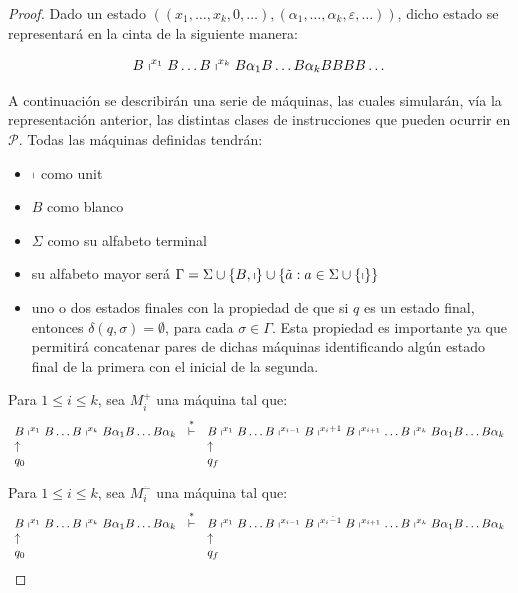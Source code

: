   \begin{proof}
    \PN Dado un estado $((x_{1}, \dotsc, x_{k}, 0, \dotsc),(\alpha_{1}, \dotsc, \alpha_{k}, \varepsilon, \dotsc))$,
    dicho estado se representará en la cinta de la siguiente manera:

    \[
      B \shortmid^{x_{1}} B \dotsc B \shortmid^{x_{k}} B \alpha_{1} B \dotsc B \alpha_{k} BBBB \dotsc
    \]

    \PN A continuación se describirán una serie de máquinas, las cuales simularán, vía la representación anterior, las
    distintas clases de instrucciones que pueden ocurrir en $\mathcal{P}$. Todas las máquinas definidas tendrán:

    \begin{itemize}
      \item $\shortmid$ como unit
      \item $B$ como blanco
      \item $\Sigma$ como su alfabeto terminal
      \item su alfabeto mayor será $\Gamma = \Sigma \cup \{B, \shortmid\} \cup \{\tilde{a}: a \in \Sigma \cup
        \{\shortmid\}\}$
      \item uno o dos estados finales con la propiedad de que si $q$ es un estado final, entonces $\delta (q,\sigma) =
        \emptyset$, para cada $\sigma \in \Gamma$.
        \PN Esta propiedad es importante ya que permitirá concatenar pares de
        dichas máquinas identificando algún estado final de la primera con el inicial de la segunda. \\
    \end{itemize}

    \PN Para $1 \leq i \leq k$, sea $M_{i}^{+}$ una máquina tal que:
    \[
      \begin{array}{lcl}
        B \shortmid^{x_{1}} B \dotsc B \shortmid^{x_{k}} B \alpha_{1} B \dotsc B \alpha_{k} &\overset{\ast}{\vdash}& B
        \shortmid^{x_{1}} B \dotsc B \shortmid^{x_{i-1}} B \shortmid^{x_{i}+1} B \shortmid^{x_{i+1}} \dotsc B
        \shortmid^{x_{k}} B \alpha_{1} B \dotsc B \alpha_{k} \\
        \uparrow && \uparrow \\
        q_{0} & & q_{f}
      \end{array}
    \]

    \PN Para $1 \leq i \leq k$, sea $M_{i}^{\dot{-}}$ una máquina tal que:
    \[
      \begin{array}{lcl}
        B \shortmid^{x_{1}} B \dotsc B \shortmid^{x_{k}} B \alpha_{1} B \dotsc B \alpha_{k} &\overset{\ast}{\vdash}& B
          \shortmid^{x_{1}} B \dotsc B \shortmid^{x_{i-1}} B \shortmid^{x_{i} \dot{-} 1} B \shortmid^{x_{i+1}} \dotsc B
          \shortmid^{x_{k}} B \alpha_{1} B \dotsc B \alpha_{k} \\
        \uparrow && \uparrow \\
        q_{0} && q_{f}
      \end{array}
    \]


\end{proof}
